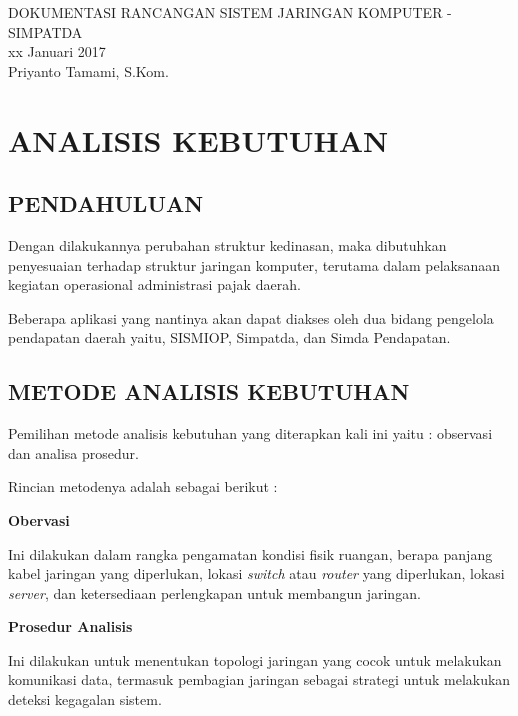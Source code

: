 \documentclass[pdftex,12pt, oneside]{article}
\begin{document}
\sloppy %

\begin{center}
{\large DOKUMENTASI RANCANGAN SISTEM JARINGAN KOMPUTER - SIMPATDA}
\\[1cm]
xx Januari 2017\\
Priyanto Tamami, S.Kom.
\end{center}




\section{ANALISIS KEBUTUHAN}

\subsection{PENDAHULUAN}

Dengan dilakukannya perubahan struktur kedinasan, maka dibutuhkan penyesuaian terhadap struktur jaringan komputer, terutama dalam pelaksanaan kegiatan operasional administrasi pajak daerah. 

Beberapa aplikasi yang nantinya akan dapat diakses oleh dua bidang pengelola pendapatan daerah yaitu, SISMIOP, Simpatda, dan Simda Pendapatan.

\subsection{METODE ANALISIS KEBUTUHAN}

Pemilihan metode analisis kebutuhan yang diterapkan kali ini yaitu : observasi dan analisa prosedur.

Rincian metodenya adalah sebagai berikut :

\textbf{Obervasi}

Ini dilakukan dalam rangka pengamatan kondisi fisik ruangan, berapa panjang kabel jaringan yang diperlukan, lokasi \textit{switch} atau \textit{router} yang diperlukan, lokasi \textit{server}, dan ketersediaan perlengkapan untuk membangun jaringan.

\textbf{Prosedur Analisis}

Ini dilakukan untuk menentukan topologi jaringan yang cocok untuk melakukan komunikasi data, termasuk pembagian jaringan sebagai strategi untuk melakukan deteksi kegagalan sistem.
\end{document}
